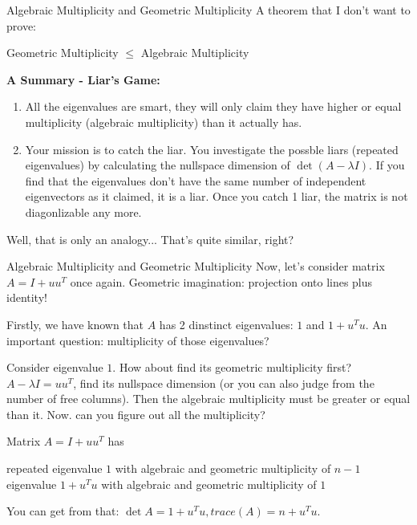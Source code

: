 \documentclass{beamer}
\begin{document}
\begin{frame}{Algebraic Multiplicity and Geometric Multiplicity}
A theorem that I don't want to prove:
\begin{center}
    Geometric Multiplicity $\leq $ Algebraic Multiplicity
\end{center}

\textbf{A Summary - Liar's Game:}
\begin{enumerate}
    \item All the eigenvalues are smart, they will only claim they have higher or equal multiplicity (algebraic multiplicity) than it actually has.
    \item Your mission is to catch the liar. You investigate the possble liars (repeated eigenvalues) by calculating the nullspace dimension of $\det (A-\lambda I)$. If you find that the eigenvalues don't have the same number of independent eigenvectors as it claimed, it is a liar. Once you catch 1 liar, the matrix is not diagonlizable any more.
\end{enumerate}

Well, that is only an analogy... That's quite similar, right?
\end{frame}

\begin{frame}{Algebraic Multiplicity and Geometric Multiplicity}
Now, let's consider matrix $A=I+uu^T$ once again. Geometric imagination: projection onto lines plus identity!

\vspace{3pt}
Firstly, we have known that $A$ has 2 dinstinct eigenvalues: $1$ and $1+u^Tu$. An important question: multiplicity of those eigenvalues?

\vspace{3pt}
Consider eigenvalue $1$. How about find its geometric multiplicity first? $A-\lambda I=uu^T$, find its nullspace dimension (or you can also judge from the number of free columns). Then the algebraic multiplicity must be greater or equal than it. Now. can you figure out all the multiplicity?

\vspace{3pt}
Matrix $A=I+uu^T$ has
\begin{center}
    repeated eigenvalue $1$ with algebraic and geometric multiplicity of $n-1$\\ eigenvalue $1+u^Tu$ with algebraic and geometric multiplicity of $1$
\end{center}

You can get from that: $\det A=1+u^Tu, trace(A)=n+u^Tu$.

\end{frame}
\end{document}
